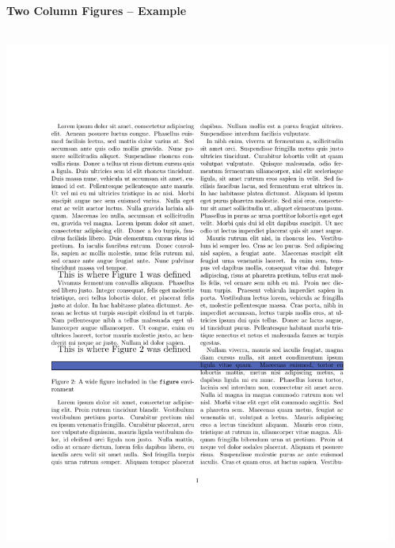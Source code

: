 \documentclass[article]{beamer}
\begin{document}
\begin{frame}
  \frametitle{\thesubsection}
  \framesubtitle{Two Column Figures -- Example}
  \begin{columns}
    \begin{column}{0.5\textwidth}
      \colorbox{white}{\includegraphics[height=0.9\textheight]{two_column_wide_figure_example.pdf}}
    \end{column}
    \begin{column}{0.5\textwidth}

\end{column}
\end{columns}
\end{frame}
\end{document}
